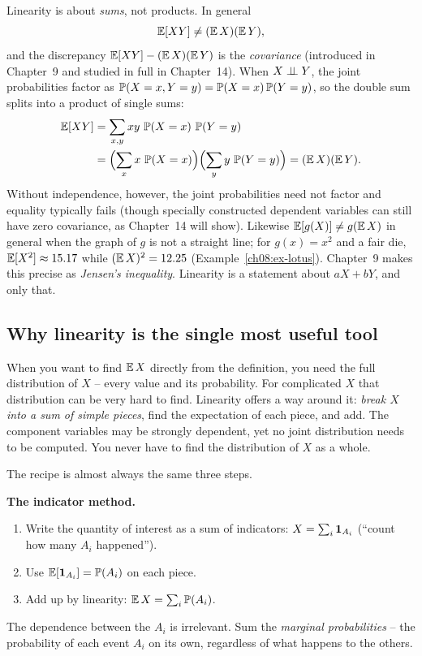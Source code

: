 \begin{trapbox}
Linearity is about \emph{sums}, not products. In general
\[
  \E[XY] \ne (\E X)(\E Y),
\]
and the discrepancy $\E[XY] - (\E X)(\E Y)$ is the \emph{covariance} (introduced
in Chapter~9 and studied in full in Chapter~14). When $X \indep Y$, the joint
probabilities factor as $\P(X=x, Y=y) = \P(X=x)\P(Y=y)$, so the double sum splits
into a product of single sums:
\begin{align*}
  \E[XY] &= \sum_{x,y} xy\,\P(X=x)\,\P(Y=y)\\
         &= \Bigl(\sum_x x\,\P(X=x)\Bigr)\Bigl(\sum_y y\,\P(Y=y)\Bigr) = (\E X)(\E Y).
\end{align*}
Without independence, however, the joint probabilities need not factor and equality
typically fails (though specially constructed dependent variables can still have
zero covariance, as Chapter~14 will show). Likewise $\E[g(X)] \ne g(\E X)$ in
general when the graph of $g$ is not a straight line; for $g(x) = x^2$ and a
fair die, $\E[X^2] \approx 15.17$ while $(\E X)^2 = 12.25$
(Example~\ref{ch08:ex-lotus}). Chapter~9 makes this precise as \emph{Jensen's
inequality}. Linearity is a statement about $aX+bY$, and only that.
\end{trapbox}

\subsection{Why linearity is the single most useful tool}

When you want to find $\E X$ directly from the definition, you need the full
distribution of $X$ -- every value and its probability. For complicated $X$ that
distribution can be very hard to find. Linearity offers a way around it: \emph{break
$X$ into a sum of simple pieces}, find the expectation of each piece, and
add. The component variables may be strongly dependent, yet no joint distribution
needs to be computed. You never have to find the distribution of $X$ as a whole.

The recipe is almost always the same three steps.

\begin{focusbox}
\textbf{The indicator method.}
\begin{enumerate}
  \item Write the quantity of interest as a sum of indicators:
        $X = \sum_i \ind_{A_i}$ (``count how many $A_i$ happened'').
  \item Use $\E[\ind_{A_i}] = \P(A_i)$ on each piece.
  \item Add up by linearity: $\E X = \sum_i \P(A_i)$.
\end{enumerate}
The dependence between the $A_i$ is irrelevant. Sum the \emph{marginal
probabilities} -- the probability of each event $A_i$ on its own, regardless
of what happens to the others.
\end{focusbox}

